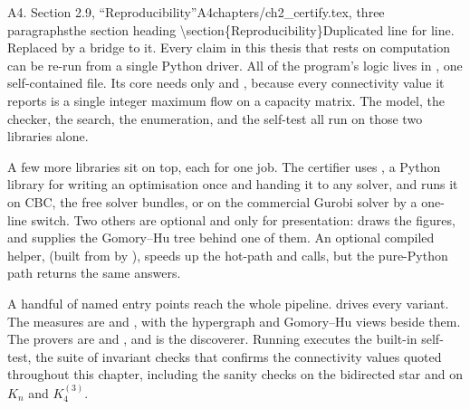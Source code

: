 \begin{offcutrewrite}{A4. Section 2.9, ``Reproducibility''}{A4}{chapters/ch2\_certify.tex, three paragraphs}{the section heading \textbackslash{}section\{Reproducibility\}}{Duplicated  line for line. Replaced by a bridge to it.}
Every claim in this thesis that rests on computation can be re-run from a single Python driver. All of the program's logic lives in , one self-contained file. Its core needs only  and , because every connectivity value it reports is a single  integer maximum flow on a capacity matrix. The model, the checker, the search, the enumeration, and the self-test all run on those two libraries alone.

A few more libraries sit on top, each for one job. The certifier uses , a Python library for writing an optimisation once and handing it to any solver, and runs it on CBC, the free solver  bundles, or on the commercial Gurobi solver by a one-line switch. Two others are optional and only for presentation:  draws the figures, and  supplies the Gomory--Hu tree behind one of them. An optional compiled helper,  (built from  by ), speeds up the hot-path  and  calls, but the pure-Python path returns the same answers.

A handful of named entry points reach the whole pipeline.  drives every variant. The measures are  and , with the hypergraph and Gomory--Hu views beside them. The provers are  and , and  is the discoverer. Running  executes the built-in self-test, the suite of invariant checks that confirms the connectivity values quoted throughout this chapter, including the sanity checks on the bidirected star and on $K_n$ and $K_4^{(3)}$.


\end{offcutrewrite}
